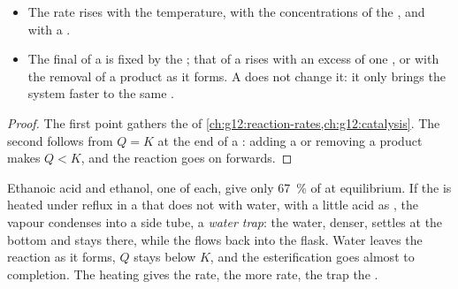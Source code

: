 \begin{proposition}\label{prop:g12:synthesis-strategy:levers}
\begin{itemize}
  \item The rate rises with the temperature, with the concentrations of
        the , and with a .
  \item The final  of a  is fixed by the ; that of a  rises with an excess of
        one , or with the removal of a product as it forms. A
         does not change it: it only brings the system faster to
        the same .
\end{itemize}
\end{proposition}

\begin{proof}
The first point gathers the  of
\cref{ch:g12:reaction-rates,ch:g12:catalysis}. The second follows from
$Q = K$ at the end of a : adding a  or removing
a product makes $Q < K$, and the reaction goes on forwards.
\end{proof}

\begin{example}\label{ex:g12:synthesis-strategy:trap}
Ethanoic acid and ethanol, one  of each, give only
\qty{67}{\percent} of  at equilibrium. If the  is heated
under reflux in a  that does not  with water, with a little
acid as , the vapour condenses into a side tube, a \emph{water
trap}: the water, denser, settles at the bottom and stays there, while
the  flows back into the flask. Water leaves the reaction as it
forms, $Q$ stays below $K$, and the esterification goes almost to
completion. The heating gives the rate, the  more rate, the trap
the .
\end{example}

